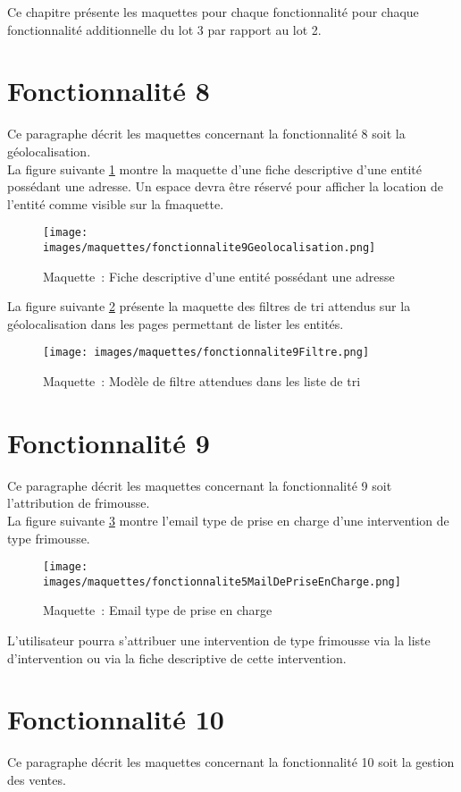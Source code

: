 Ce chapitre présente les maquettes pour chaque fonctionnalité pour chaque fonctionnalité additionnelle du lot 3 par rapport au lot 2.


\section{Fonctionnalité 8}
Ce paragraphe décrit les maquettes concernant la fonctionnalité 8 soit la géolocalisation. \\

La figure suivante \ref{maquette8-1} montre la maquette d'une fiche descriptive d'une entité possédant une adresse. Un espace devra être réservé pour afficher la location de l'entité comme visible sur la fmaquette.
\begin{figure}[H]
	\centering
	\texttt{[image: images/maquettes/fonctionnalite9Geolocalisation.png]}
	\caption{Maquette~: Fiche descriptive d'une entité possédant une adresse}
	\label{maquette8-1}
\end{figure}
La figure suivante \ref{maquette8-2} présente la maquette des filtres de tri attendus sur la géolocalisation dans les pages permettant de lister les entités.
\begin{figure}[H]
	\centering
	\texttt{[image: images/maquettes/fonctionnalite9Filtre.png]}
	\caption{Maquette~: Modèle de filtre attendues dans les liste de tri}
	\label{maquette8-2}
\end{figure}

\section{Fonctionnalité 9}
Ce paragraphe décrit les maquettes concernant la fonctionnalité 9 soit l'attribution de frimousse. \\

La figure suivante \ref{maquette9-1} montre l'email type de prise en charge d'une intervention de type frimousse.
\begin{figure}[H]
	\centering
	\texttt{[image: images/maquettes/fonctionnalite5MailDePriseEnCharge.png]}
	\caption{Maquette~: Email type de prise en charge}
	\label{maquette9-1}
\end{figure}
 L'utilisateur pourra s'attribuer une intervention de type frimousse via la liste d'intervention ou via la fiche descriptive de cette intervention.


\section{Fonctionnalité 10}
Ce paragraphe décrit les maquettes concernant la fonctionnalité 10 soit la gestion des ventes. \\

